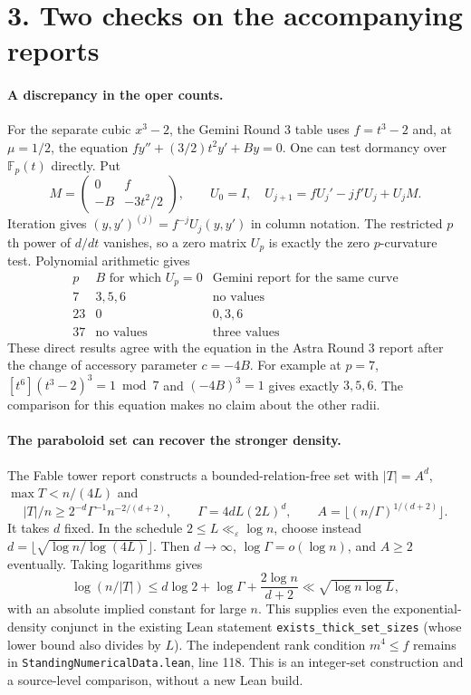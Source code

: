 \documentclass[11pt]{article}
\begin{document}
\newpage
\section*{3. Two checks on the accompanying reports}
\paragraph{A discrepancy in the oper counts.}
For the separate cubic $x^3-2$, the Gemini Round 3 table uses
$f=t^3-2$ and, at $\mu=1/2$, the equation
$f y''+(3/2)t^2 y'+B y=0$. One can test dormancy over
$\mathbb F_p(t)$ directly. Put
\[
 M=\begin{pmatrix}0&f\\-B&-3t^2/2\end{pmatrix},\qquad
 U_0=I,\quad U_{j+1}=fU_j'-jf'U_j+U_jM .
\]
Iteration gives $(y,y')^{(j)}=f^{-j}U_j(y,y')$ in column notation.
The restricted $p$th power of $d/dt$ vanishes, so a zero matrix $U_p$
is exactly the zero $p$-curvature test. Polynomial arithmetic gives
\[
\begin{array}{c|c|c}
 p & B\text{ for which }U_p=0 &\text{Gemini report for the same curve}\\ \hline
 7 & 3,5,6&\text{no values}\\
 23 &0&0,3,6\\
 37 &\text{no values}&\text{three values}
\end{array}
\]
These direct results agree with the equation in the Astra Round 3 report
after the change of accessory parameter $c=-4B$. For example at $p=7$,
$[t^6](t^3-2)^3=1\bmod7$ and $(-4B)^3=1$ gives exactly $3,5,6$.
The comparison for this equation makes no claim about the other radii.

\paragraph{The paraboloid set can recover the stronger density.}
The Fable tower report constructs a bounded-relation-free set with
$|T|=A^d$, $\max T<n/(4L)$ and
\[
 |T|/n\ge 2^{-d}\Gamma^{-1}n^{-2/(d+2)},\qquad
 \Gamma=4dL(2L)^d,\qquad A=\lfloor(n/\Gamma)^{1/(d+2)}\rfloor .
\]
It takes $d$ fixed. In the schedule $2\le L\ll_\varepsilon\log n$,
choose instead $d=\lfloor\sqrt{\log n/\log(4L)}\rfloor$.
Then $d\to\infty$, $\log\Gamma=o(\log n)$, and $A\ge2$ eventually.
Taking logarithms gives
\[
 \log(n/|T|)\le d\log2+\log\Gamma+\frac{2\log n}{d+2}
 \ll\sqrt{\log n\log L},
\]
with an absolute implied constant for large $n$. This supplies even the
exponential-density conjunct in the existing Lean statement
\texttt{exists\_thick\_set\_sizes} (whose lower bound also divides by $L$).
The independent rank condition $m^4\le f$ remains in
\texttt{StandingNumericalData.lean}, line 118. This is an integer-set
construction and a source-level comparison, without a new Lean build.
\end{document}
